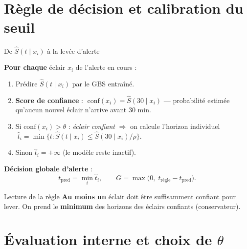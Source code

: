 \documentclass[aspectratio=169,t,11pt]{beamer}
\begin{document}
\section{Règle de décision et calibration du seuil}

\begin{frame}{De $\hat{S}(t \mid x_i)$ à la levée d'alerte}
\vspace{-2pt}
\begin{tcolorbox}[mybox,colback=metBlue!5,colframe=metBlue,
  title={Algorithme de décision (seuil $\theta$, ratio $\rho = 0{,}98$)}]
\footnotesize
\textbf{Pour chaque} éclair $x_i$ de l'alerte en cours :
\begin{enumerate}\setlength\itemsep{0pt}
  \item Prédire $\hat{S}(t \mid x_i)$ par le GBS entraîné.
  \item \textbf{Score de confiance} : $\;\mathrm{conf}(x_i) = \hat{S}(30 \mid x_i)$
        — probabilité estimée qu'aucun nouvel éclair n'arrive avant 30 min.
  \item Si $\mathrm{conf}(x_i) > \theta$ : \emph{éclair confiant} $\Rightarrow$
        on calcule l'horizon individuel
        $\;\hat{t}_i = \min\!\bigl\{ t : \hat{S}(t \mid x_i) \le \hat{S}(30 \mid x_i)/\rho \bigr\}.$
  \item Sinon $\hat{t}_i = +\infty$ (le modèle reste inactif).
\end{enumerate}
\vspace{2pt}
\textbf{Décision globale d'alerte} :
\[
t_{\mathrm{pred}} = \min_i \hat{t}_i, \qquad G = \max\!\bigl(0,\; t_{\mathrm{règle}} - t_{\mathrm{pred}}\bigr).
\]
\end{tcolorbox}
\vspace{4pt}
\begin{exampleblock}{Lecture de la règle}
\scriptsize
\textbf{Au moins un} éclair doit être suffisamment confiant pour lever.
On prend le \textbf{minimum} des horizons des éclairs confiants (conservateur).
\end{exampleblock}
\end{frame}

\section{Évaluation interne et choix de $\theta$}
\end{document}
